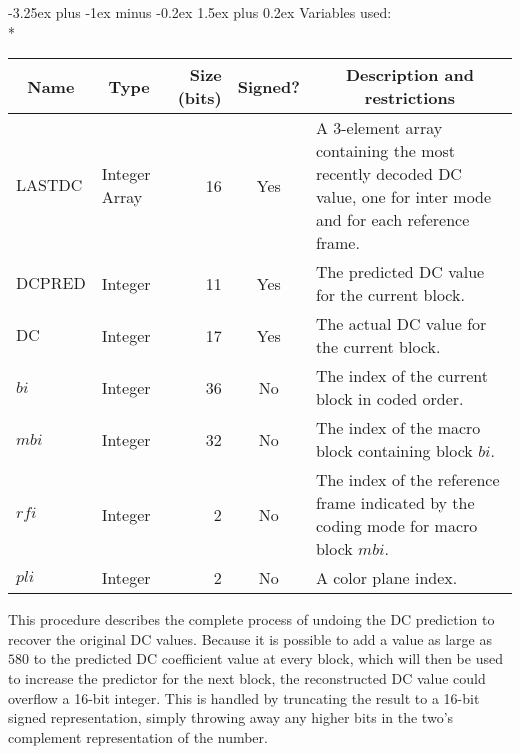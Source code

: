 \documentclass[9pt,letterpaper]{book}
\makeatletter
\newcommand{\idx}[1]{{\ensuremath{\mathit{#1}}}}
\newcommand{\pli}{\idx{pli}}
\newcommand{\bi}{\idx{bi}}
\newcommand{\mbi}{\idx{mbi}}
\newcommand{\rfi}{\idx{rfi}}
\newcommand{\locvar}[1]{\ensuremath{\mathrm{#1}}}
\numberwithin{equation}{chapter}
\numberwithin{figure}{chapter}
\numberwithin{table}{chapter}
\renewcommand{\paragraph}{\@startsection{paragraph}{4}{0ex}%
 {-3.25ex plus -1ex minus -0.2ex}%
 {1.5ex plus 0.2ex}%
 {\normalfont\normalsize\bfseries}}
\makeatother
\begin{document}
\paragraph{Variables used:}\hfill\\*
\begin{tabularx}{\textwidth}{@{}llrcX@{}}\toprule
\multicolumn{1}{c}{Name} &
\multicolumn{1}{c}{Type} &
\multicolumn{1}{p{30pt}}{\centering Size (bits)} &
\multicolumn{1}{c}{Signed?} &
\multicolumn{1}{c}{Description and restrictions} \\\midrule\endhead
\locvar{LASTDC}   & \multicolumn{1}{p{40pt}}{Integer Array} &
                              16 & Yes & A 3-element array containing the
 most recently decoded DC value, one for inter mode and for each reference
 frame. \\
\locvar{DCPRED}   & Integer & 11 & Yes & The predicted DC value for the current
 block. \\
\locvar{DC}       & Integer & 17 & Yes & The actual DC value for the current
 block. \\
\locvar{\bi}      & Integer & 36 & No  & The index of the current block in
 coded order. \\
\locvar{\mbi}     & Integer & 32 & No  & The index of the macro block
 containing block \locvar{\bi}. \\
\locvar{\rfi}     & Integer &  2 & No  & The index of the reference frame
 indicated by the coding mode for macro block \locvar{\mbi}. \\
\locvar{\pli}     & Integer &  2 & No  & A color plane index. \\
\bottomrule\end{tabularx}
\medskip

This procedure describes the complete process of undoing the DC prediction to
 recover the original DC values.
Because it is possible to add a value as large as $580$ to the predicted DC
 coefficient value at every block, which will then be used to increase the
 predictor for the next block, the reconstructed DC value could overflow a
 16-bit integer.
This is handled by truncating the result to a 16-bit signed representation,
 simply throwing away any higher bits in the two's complement representation of
 the number.
\end{document}
